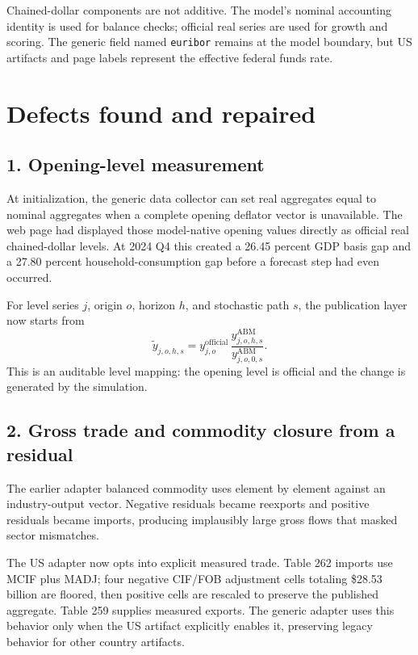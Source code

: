 \documentclass[10pt]{article}
\begin{document}
\begin{cautionbox}
Chained-dollar components are not additive. The model's nominal accounting
identity is used for balance checks; official real series are used for growth
and scoring. The generic field named \texttt{euribor} remains at the model
boundary, but US artifacts and page labels represent the effective federal
funds rate.
\end{cautionbox}

\section{Defects found and repaired}

\subsection{1. Opening-level measurement}

At initialization, the generic data collector can set real aggregates equal to
nominal aggregates when a complete opening deflator vector is unavailable. The
web page had displayed those model-native opening values directly as official
real chained-dollar levels. At 2024 Q4 this created a 26.45 percent GDP basis
gap and a 27.80 percent household-consumption gap before a forecast step had
even occurred.

For level series \(j\), origin \(o\), horizon \(h\), and stochastic path \(s\),
the publication layer now starts from
\[
\widetilde y_{j,o,h,s}
=y^{\mathrm{official}}_{j,o}\,
\frac{y^{\mathrm{ABM}}_{j,o,h,s}}{y^{\mathrm{ABM}}_{j,o,0,s}}.
\]
This is an auditable level mapping: the opening level is official and the
change is generated by the simulation.

\subsection{2. Gross trade and commodity closure from a residual}

The earlier adapter balanced commodity uses element by element against an
industry-output vector. Negative residuals became reexports and positive
residuals became imports, producing implausibly large gross flows that masked
sector mismatches.

The US adapter now opts into explicit measured trade. Table 262 imports use
MCIF plus MADJ; four negative CIF/FOB adjustment cells totaling
\$28.53 billion are floored, then positive cells are rescaled to preserve the
published aggregate. Table 259 supplies measured exports. The generic adapter
uses this behavior only when the US artifact explicitly enables it, preserving
legacy behavior for other country artifacts.
\end{document}
